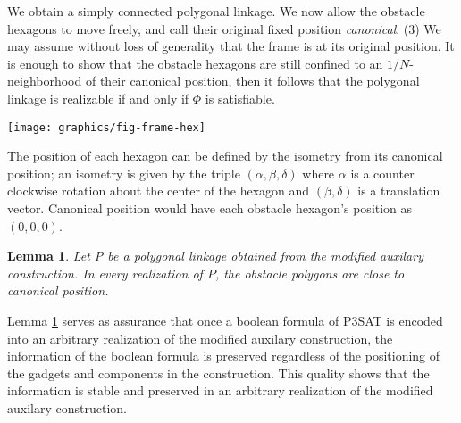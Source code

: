 \documentclass[10pt]{CSUNthesis}
\theoremstyle{plain}%
\newtheorem{lem}{Lemma}
\theoremstyle{definition}
\theoremstyle{remark}
\newcommand{\lr}[1]{\left( #1 \right)}
\begin{document}
We obtain a simply connected polygonal linkage. 
We now allow the obstacle hexagons to move freely, and call their original fixed position \emph{canonical}. 
\noindent (3) We may assume without loss of generality that the frame is at its original position. 
It is enough to show that the obstacle hexagons are still confined to an $1/N$-neighborhood of their canonical position, then it
follows that the polygonal linkage is realizable if and only if $\Phi$ is satisfiable.

\begin{minipage}{\linewidth}
	\begin{center}
	\texttt{[image: graphics/fig-frame-hex]}
	\label{fig:frame}
	\end{center}
\end{minipage}

The position of each hexagon can be defined by the isometry from its canonical position; an isometry is given by the triple $\lr{\alpha, \beta, \delta}$ where $\alpha$ is a counter clockwise rotation about the center of the hexagon and $\lr{\beta,\delta}$ is a translation vector.  
Canonical position would have each obstacle hexagon's position as $(0,0,0)$.
\begin{lem}\label{lem:aux-C}
Let P be a polygonal linkage obtained from the modified auxilary construction.  
In every realization of $P$, the obstacle polygons are close to canonical position.
\end{lem}

Lemma \ref{lem:aux-C} serves as assurance that once a boolean formula of P3SAT is encoded into an arbitrary realization of the modified auxilary construction, the information of the boolean formula is preserved regardless of the positioning of the gadgets and components in the construction.
This quality shows that the information is stable and preserved in an arbitrary realization of the modified auxilary construction.
\end{document}
